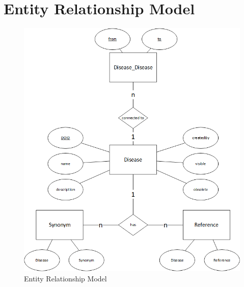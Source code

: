 \chapter{Entity Relationship Model}
\label{Anhang_ER}
\vspace*{\fill}
\begin{figure}[H]
\centering
\includegraphics[scale=0.75]{bilder/ER.png}
\caption{Entity Relationship Model}
\end{figure}
\vspace*{\fill}

